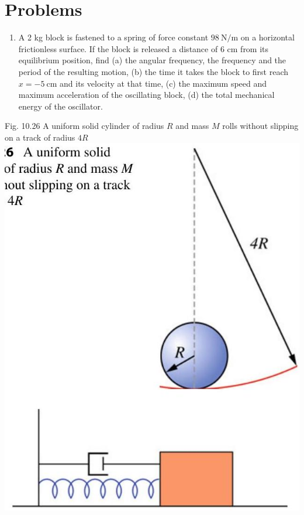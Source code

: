 \documentclass[10pt]{article}
\begin{document}
\section*{Problems}
\begin{enumerate}
  \item A 2 kg block is fastened to a spring of force constant $98 \mathrm{~N} / \mathrm{m}$ on a horizontal frictionless surface. If the block is released a distance of 6 cm from its equilibrium position, find (a) the angular frequency, the frequency and the period of the resulting motion, (b) the time it takes the block to first reach $x=-5 \mathrm{~cm}$ and its velocity at that time, (c) the maximum speed and maximum acceleration of the oscillating block, (d) the total mechanical energy of the oscillator.
\end{enumerate}

Fig. 10.26 A uniform solid cylinder of radius $R$ and mass $M$ rolls without slipping on a track of radius $4 R$\\
\includegraphics[max width=\textwidth, center]{2024_09_13_db1f357d2aad0a03eb2eg-177}
\end{document}
